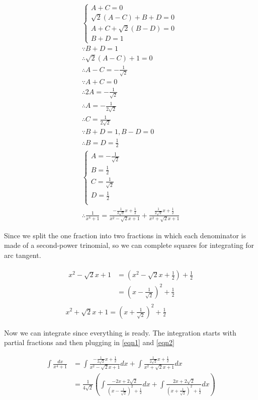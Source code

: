 $$
\begin{aligned}
	\begin{cases}
		A+C=0 \\
		\sqrt2(A-C)+B+D=0 \\
		A+C+\sqrt2(B-D)=0 \\
		B+D=1 \label{e_d}
	\end{cases} \\
	\because B+D=1 \\
	\therefore \sqrt2(A-C)+1=0 \\
	\therefore A-C=-\frac{1}{\sqrt2} \\
	\because A+C=0 \\
	\therefore 2A=-\frac{1}{\sqrt2} \\
	\therefore A=-\frac{1}{2\sqrt2} \\
	\therefore C=\frac{1}{2\sqrt2} \\
	\because B+D=1,B-D=0 \\
	\therefore B=D=\frac{1}2 \\
	\begin{cases}
		A=-\frac{1}{\sqrt2} \\
		B=\frac{1}2 \\
		C=\frac{1}{\sqrt2} \\
		D=\frac{1}2 \\
	\end{cases} \\
	\therefore \frac{1}{x^4+1}=\frac{-\frac{1}{2\sqrt2}x+
	\frac{1}2}{x^2-\sqrt2x+1}+\frac{\frac{1}{2\sqrt2}x+
	\frac{1}2}{x^2+\sqrt2x+1}
\end{aligned}
$$

Since we split the one fraction into two fractions in which each denominator is
made of a second-power trinomial, so we can complete squares for integrating
for arc tangent.

\begin{eqnarray}
	\begin{aligned}
		x^2-\sqrt2x+1
		&=(x^2-\sqrt2x+\frac{1}2)+\frac{1}2 \\
		&=(x-\frac{1}{\sqrt2})^2+\frac{1}2
	\end{aligned} \label{eqn1}\\
	x^2+\sqrt2x+1=(x+\frac{1}{\sqrt2})^2+\frac{1}2 \label{eqn2}
\end{eqnarray}

Now we can integrate since everything is ready. The integration starts with
partial fractions and then plugging in \ref{eqn1} and \ref{eqn2}

$$
\begin{aligned}
	\int\frac{dx}{x^4+1}&=\int\frac{-\frac{1}{2\sqrt2}x+
	\frac{1}2}{x^2-\sqrt2x+1}dx+\int\frac{\frac{1}{2\sqrt2}x+
	\frac{1}2}{x^2+\sqrt2x+1}dx \\
	&=\frac{1}{4\sqrt2}\left(\int\frac{-2x+2\sqrt2}{(x-\frac{1}{\sqrt2})^2
	+\frac{1}2}dx+\int\frac{2x+2\sqrt2}{(x+\frac{1}{\sqrt2})^2+\frac{1}2}dx
	\right)
\end{aligned}
$$

